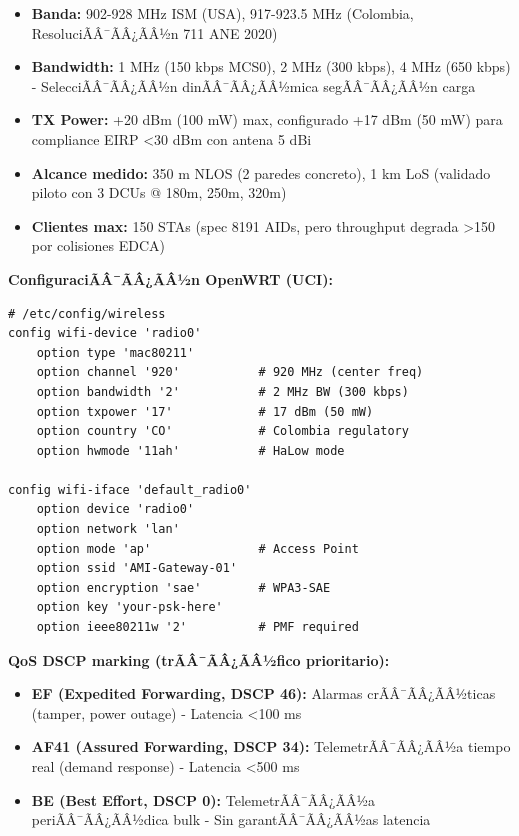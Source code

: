 \begin{itemize}
    \item \textbf{Banda:} 902-928 MHz ISM (USA), 917-923.5 MHz (Colombia, ResoluciÃÂ¯ÃÂ¿ÃÂ½n 711 ANE 2020)
    \item \textbf{Bandwidth:} 1 MHz (150 kbps MCS0), 2 MHz (300 kbps), 4 MHz (650 kbps) - SelecciÃÂ¯ÃÂ¿ÃÂ½n dinÃÂ¯ÃÂ¿ÃÂ½mica segÃÂ¯ÃÂ¿ÃÂ½n carga
    \item \textbf{TX Power:} +20 dBm (100 mW) max, configurado +17 dBm (50 mW) para compliance EIRP <30 dBm con antena 5 dBi
    \item \textbf{Alcance medido:} 350 m NLOS (2 paredes concreto), 1 km LoS (validado piloto con 3 DCUs @ 180m, 250m, 320m)
    \item \textbf{Clientes max:} 150 STAs (spec 8191 AIDs, pero throughput degrada >150 por colisiones EDCA)
\end{itemize}

\textbf{ConfiguraciÃÂ¯ÃÂ¿ÃÂ½n OpenWRT (UCI):}

\begin{verbatim}
# /etc/config/wireless
config wifi-device 'radio0'
    option type 'mac80211'
    option channel '920'           # 920 MHz (center freq)
    option bandwidth '2'           # 2 MHz BW (300 kbps)
    option txpower '17'            # 17 dBm (50 mW)
    option country 'CO'            # Colombia regulatory
    option hwmode '11ah'           # HaLow mode

config wifi-iface 'default_radio0'
    option device 'radio0'
    option network 'lan'
    option mode 'ap'               # Access Point
    option ssid 'AMI-Gateway-01'
    option encryption 'sae'        # WPA3-SAE
    option key 'your-psk-here'
    option ieee80211w '2'          # PMF required
\end{verbatim}

\textbf{QoS DSCP marking (trÃÂ¯ÃÂ¿ÃÂ½fico prioritario):}

\begin{itemize}
    \item \textbf{EF (Expedited Forwarding, DSCP 46):} Alarmas crÃÂ¯ÃÂ¿ÃÂ½ticas (tamper, power outage) - Latencia <100 ms
    \item \textbf{AF41 (Assured Forwarding, DSCP 34):} TelemetrÃÂ¯ÃÂ¿ÃÂ½a tiempo real (demand response) - Latencia <500 ms
    \item \textbf{BE (Best Effort, DSCP 0):} TelemetrÃÂ¯ÃÂ¿ÃÂ½a periÃÂ¯ÃÂ¿ÃÂ½dica bulk - Sin garantÃÂ¯ÃÂ¿ÃÂ½as latencia
\end{itemize}

